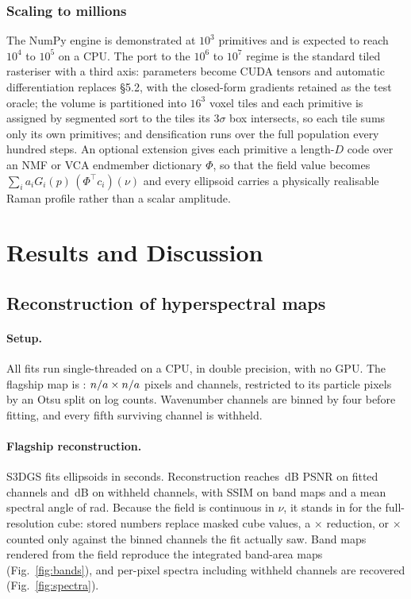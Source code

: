 \subsubsection{Scaling to millions}
\label{sec:scale}
The NumPy engine is demonstrated at $10^3$ primitives and is expected to reach
$10^4$ to $10^5$ on a CPU. The port to the $10^6$ to $10^7$ regime is the
standard tiled rasteriser \cite{kerbl20233dgs} with a third axis: parameters
become CUDA tensors and automatic differentiation replaces \S5.2, with the
closed-form gradients retained as the test oracle; the volume is partitioned
into $16^3$ voxel tiles and each primitive is assigned by segmented sort to the
tiles its $3\sigma$ box intersects, so each tile sums only its own primitives;
and densification runs over the full population every hundred steps. An
optional extension gives each primitive a length-$D$ code over an NMF or VCA
endmember dictionary $\Phi$, so that the field value becomes $\sum_i a_i
G_i(p)\,(\Phi^\top c_i)(\nu)$ and every ellipsoid carries a physically
realisable Raman profile rather than a scalar amplitude.


\section{Results and Discussion}
\label{sec:results}

\subsection{Reconstruction of hyperspectral maps}

\paragraph{Setup.}
All fits run single-threaded on a CPU, in double precision, with no GPU.
The flagship map is \SplatAcq{}: $n/a\times n/a$ pixels and
\SplatMapK{} channels, restricted to its \SplatMaskPts{} particle pixels by an
Otsu split on log counts. Wavenumber channels are binned by four before
fitting, and every fifth surviving channel is withheld.

\paragraph{Flagship reconstruction.}
S3DGS fits \SplatN{} ellipsoids in \SplatSeconds{} seconds. Reconstruction
reaches \SplatPSNRtrain\,dB PSNR on fitted channels and \SplatPSNReval\,dB on
withheld channels, with SSIM \SplatSSIM{} on band maps and a mean spectral
angle of \SplatSAM{} rad. Because the field is continuous in $\nu$, it stands
in for the full-resolution cube: \SplatParams{} stored numbers replace
\SplatRawValues{} masked cube values, a \SplatCompression$\times$ reduction, or
\SplatCompressionBinned$\times$ counted only against the binned channels the
fit actually saw. Band maps rendered from the field reproduce the integrated
band-area maps (Fig.~\ref{fig:bands}), and per-pixel spectra including withheld
channels are recovered (Fig.~\ref{fig:spectra}).

